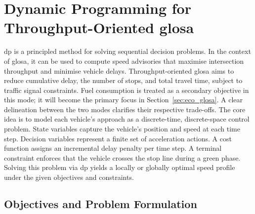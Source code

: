 \section{Dynamic Programming for Throughput-Oriented \ac{glosa}}
\label{sec:flow_glosa}

\ac{dp} is a principled method for solving sequential decision problems. In the context of \ac{glosa}, it can be used to compute speed advisories that maximise intersection throughput and minimise vehicle delays. Throughput-oriented \ac{glosa} aims to reduce cumulative delay, the number of stops, and total travel time, subject to traffic signal constraints. Fuel consumption is treated as a secondary objective in this mode; it will become the primary focus in Section~\ref{sec:eco_glosa}. A clear delineation between the two modes clarifies their respective trade-offs.
\mynewline
The core idea is to model each vehicle’s approach as a discrete-time, discrete-space control problem. State variables capture the vehicle’s position and speed at each time step. Decision variables represent a finite set of acceleration actions. A cost function assigns an incremental delay penalty per time step. A terminal constraint enforces that the vehicle crosses the stop line during a green phase. Solving this problem via \ac{dp} yields a locally or globally optimal speed profile under the given objectives and constraints.

\subsection{Objectives and Problem Formulation}
\label{subsec:flow_dp_formulation}

